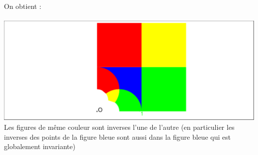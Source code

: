 \documentclass[a4paper,11pt]{book}
\begin{document}
On obtient :\\
\ \\
\includegraphics[width=\textwidth]{damierinv}
Les figures de m\^eme couleur sont inverses l'une de l'autre (en particulier 
les inverses des points de la figure bleue sont aussi dans la figure bleue qui 
est globalement invariante)
\section{}
\end{document}
